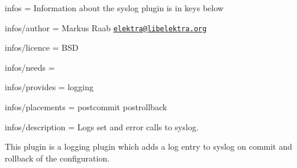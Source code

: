
\begin{DoxyItemize}
\item infos = Information about the syslog plugin is in keys below
\item infos/author = Markus Raab \href{mailto:elektra@libelektra.org}{\tt elektra@libelektra.\+org}
\item infos/licence = B\+S\+D
\item infos/needs =
\item infos/provides = logging
\item infos/placements = postcommit postrollback
\item infos/description = Logs set and error calls to syslog.
\end{DoxyItemize}

This plugin is a logging plugin which adds a log entry to syslog on commit and rollback of the configuration. 